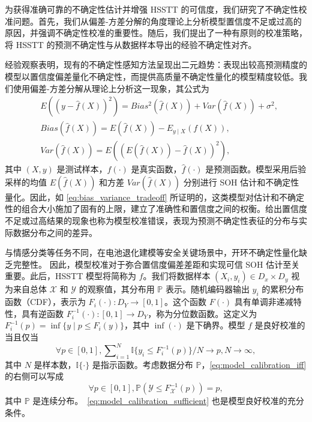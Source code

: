 \documentclass[UTF8,journal,twoside,web]{ieeecolor}
\newcommand{\newtext}[1]{{\leavevmode\color{blue}#1}}
\begin{document}
为获得准确可靠的不确定性估计并增强 HSSTT 的可信度，我们研究了不确定性校准问题。首先，我们从偏差-方差分解的角度理论上分析模型置信度不足或过高的原因，并强调不确定性校准的重要性。随后，我们提出了一种有原则的校准策略，将 HSSTT 的预测不确定性与从数据样本导出的经验不确定性对齐。

经验观察表明，现有的不确定性感知方法呈现出二元趋势：表现出较高预测精度的模型以置信度偏差量化不确定性，而提供高质量不确定性量化的模型精度较低。我们使用偏差-方差分解从理论上分析这一现象，其公式为
\begin{align}
\label{eq:bias_variance_tradeoff} & E((y-\hat{f}(X))^{2}) = Bias^{2}(\hat{f}(X))+Var(\hat{f}(X))+\sigma^{2}, \\
\label{eq:bias} & Bias(\hat{f}(X)) = E(\hat{f}(X))-E_{y \mid X}(f(X)), \\
\label{eq:variance} & Var(\hat{f}(X)) = E((E(\hat{f}(X))-\hat{f}(X))^{2}),
\end{align}%
其中 $(X, y)$ 是测试样本，$f(\cdot)$ 是真实函数，$\hat{f}(\cdot)$ 是预测函数。模型采用后验采样的均值 $E(\hat{f}(X))$ 和方差 $Var(\hat{f}(X))$ 分别进行 SOH 估计和不确定性量化。因此，如 \eqref{eq:bias_variance_tradeoff} 所证明的，这类模型对估计和不确定性的组合大小施加了固有的上限，建立了准确性和置信度之间的权衡。给出置信度不足或过高结果的现象也称为模型校准错误\cite{kuleshov2018accurate}，表现为预测不确定性表征的分布与实际数据分布之间的差异。

\newtext{与情感分类等任务不同\cite{20230613569727}，在电池退化建模等安全关键场景中，开环不确定性量化缺乏完整性。}
因此，模型校准对于弥合置信度偏差差距和实现可信 SOH 估计至关重要。此后，HSSTT 模型将简称为 $f$。我们将数据样本 $(X_{i},y_{i}) \in D_{x}\times D_{y}$ 视为来自总体 $\mathcal{X}$ 和 $\mathcal{Y}$ 的观察值，其分布用 $\mathbb{P}$ 表示。随机编码器输出 $y_i$ 的累积分布函数（CDF），表示为 $F_i(\cdot): D_Y \to [0,1]$。这个函数 $F(\cdot)$ 具有单调非递减特性，具有逆函数 $F_{i}^{-1}(\cdot): [0,1] \to D_{Y}$，称为分位数函数。这定义为 $F_{i}^{-1}(p) = \inf\{y \mid p \leq F_{i}(y)\}$，其中 $\inf(\cdot)$ 是下确界。模型 $f$ 是良好校准的当且仅当
\begin{equation}
\forall p \in [0,1], \sum\nolimits_{i=1}^{N} \mathbb{I}\{y_{i}\leq F_{i}^{-1}(p)\}/N\rightarrow p,N\rightarrow\infty,
\label{eq:model_calibration_iff}
\end{equation}%
其中 $N$ 是样本数，$\mathbb{I}\{\cdot\}$ 是指示函数。考虑数据分布 $\mathbb{P}$，\eqref{eq:model_calibration_iff} 的右侧可以写成
\begin{equation}
\forall p\in[0,1], \mathbb{P}(\mathcal{Y}\leq F_{\mathcal{X}}^{-1}(p))=p,
\label{eq:model_calibration_sufficient}
\end{equation}%
其中 $\mathbb{P}$ 是连续分布。~\eqref{eq:model_calibration_sufficient} 也是模型良好校准的充分条件\cite{kuleshov2018accurate}。
\end{document}
